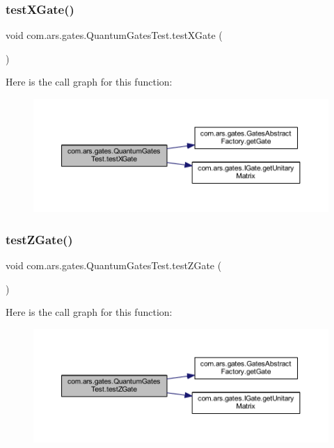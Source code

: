 \subsubsection{\texorpdfstring{test\+X\+Gate()}{testXGate()}}
{\footnotesize\ttfamily void com.\+ars.\+gates.\+Quantum\+Gates\+Test.\+test\+X\+Gate (\begin{DoxyParamCaption}{ }\end{DoxyParamCaption})}

Here is the call graph for this function\+:\nopagebreak
\begin{figure}[H]
\begin{center}
\leavevmode
\includegraphics[width=350pt]{classcom_1_1ars_1_1gates_1_1_quantum_gates_test_a38b64a39ed314a921858b2b11bfd9b6f_cgraph}
\end{center}
\end{figure}
\hypertarget{classcom_1_1ars_1_1gates_1_1_quantum_gates_test_a3149a4e2edd55f7e92974d014ec94484}{}\label{classcom_1_1ars_1_1gates_1_1_quantum_gates_test_a3149a4e2edd55f7e92974d014ec94484} 
\subsubsection{\texorpdfstring{test\+Z\+Gate()}{testZGate()}}
{\footnotesize\ttfamily void com.\+ars.\+gates.\+Quantum\+Gates\+Test.\+test\+Z\+Gate (\begin{DoxyParamCaption}{ }\end{DoxyParamCaption})}

Here is the call graph for this function\+:\nopagebreak
\begin{figure}[H]
\begin{center}
\leavevmode
\includegraphics[width=350pt]{classcom_1_1ars_1_1gates_1_1_quantum_gates_test_a3149a4e2edd55f7e92974d014ec94484_cgraph}
\end{center}
\end{figure}


